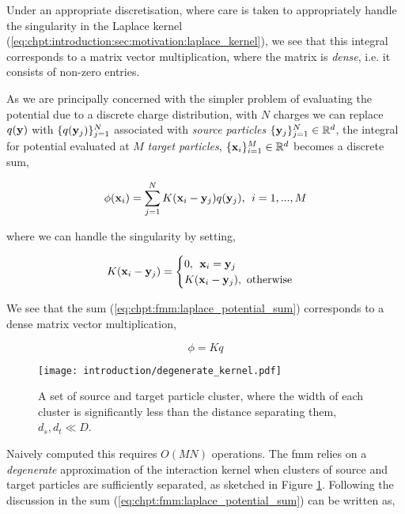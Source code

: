 Under an appropriate discretisation, where care is taken to appropriately handle the singularity in the Laplace kernel (\ref{eq:chpt:introduction:sec:motivation:laplace_kernel}), we see that this integral corresponds to a matrix vector multiplication, where the matrix is \textit{dense}, i.e. it consists of non-zero entries.

As we are principally concerned with the simpler problem of evaluating the potential due to a discrete charge distribution, with $N$ charges we can replace $q(\mathbf{y})$ with $\{ q(\mathbf{y}_j) \}_{j=1}^N$ associated with \textit{source particles} $\{\mathbf{y}_j\}_{j=1}^N \in \mathbb{R}^d$, the integral for potential evaluated at $M$ \textit{target particles}, $\{\mathbf{x}_i \}_{i=1}^M \in \mathbb{R}^d$ becomes a discrete sum,

\begin{equation}
    \phi(\mathbf{x}_i) = \sum_{j=1}^N K(\mathbf{x}_i-\mathbf{y}_j)q(\mathbf{y}_j), \> \> i = 1,...,M
    \label{eq:chpt:fmm:laplace_potential_sum}
\end{equation}

where we can handle the singularity by setting,

\begin{equation}
    K(\mathbf{x}_i - \mathbf{y}_j) = \begin{cases}
        0, \> \> \mathbf{x}_i = \mathbf{y}_j \\
        K(\mathbf{x}_i - \mathbf{y}_j), \text{  otherwise}
    \end{cases}
\end{equation}


We see that the sum (\ref{eq:chpt:fmm:laplace_potential_sum}) corresponds to a dense matrix vector multiplication,

\begin{equation}
    \phi = K q
\end{equation}


\begin{figure}
    \centering
    \texttt{[image: introduction/degenerate\_kernel.pdf]}
    \caption{A set of source and target particle cluster, where the width of each cluster is significantly less than the distance separating them, $d_s, d_t \ll D$.}
    \label{fig:chpt:fmm:degenerate_kernel}
\end{figure}

Naively computed this requires $O(MN)$ operations. The \acrshort{fmm} relies on a \textit{degenerate} approximation of the interaction kernel when clusters of source and target particles are sufficiently separated, as sketched in Figure \ref{fig:chpt:fmm:degenerate_kernel}. Following the discussion in \cite{kailasa2024m2ltranslationoperatorskernel} the sum (\ref{eq:chpt:fmm:laplace_potential_sum}) can be written as,

